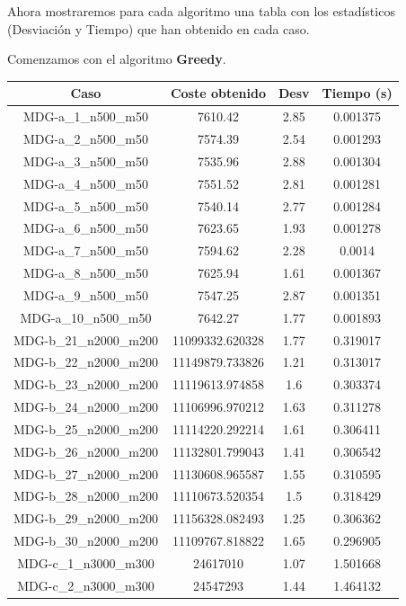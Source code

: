 \documentclass{article}
\begin{document}
Ahora mostraremos para cada algoritmo una tabla con los estadísticos (Desviación y Tiempo) que han obtenido en cada
caso.

\pagebreak

Comenzamos con el algoritmo \textbf{Greedy}.

\begin{table}[H]
	\centering
	\begin{tabular}{|cccc|}
		\hline
		Caso & Coste obtenido & Desv & Tiempo (s)\\ \hline
		MDG-a\_1\_n500\_m50 & 7610.42 & 2.85 & 0.001375\\
		MDG-a\_2\_n500\_m50 & 7574.39 & 2.54 & 0.001293\\
		MDG-a\_3\_n500\_m50 & 7535.96 & 2.88 & 0.001304\\
		MDG-a\_4\_n500\_m50 & 7551.52 & 2.81 & 0.001281\\
		MDG-a\_5\_n500\_m50 & 7540.14 & 2.77 & 0.001284\\
		MDG-a\_6\_n500\_m50 & 7623.65 & 1.93 & 0.001278\\
		MDG-a\_7\_n500\_m50 & 7594.62 & 2.28 & 0.0014\\
		MDG-a\_8\_n500\_m50 & 7625.94 & 1.61 & 0.001367\\
		MDG-a\_9\_n500\_m50 & 7547.25 & 2.87 & 0.001351\\
		MDG-a\_10\_n500\_m50 & 7642.27 & 1.77 & 0.001893\\
		MDG-b\_21\_n2000\_m200 & 11099332.620328 & 1.77 & 0.319017\\
		MDG-b\_22\_n2000\_m200 & 11149879.733826 & 1.21 & 0.313017\\
		MDG-b\_23\_n2000\_m200 & 11119613.974858 & 1.6 & 0.303374\\
		MDG-b\_24\_n2000\_m200 & 11106996.970212 & 1.63 & 0.311278\\
		MDG-b\_25\_n2000\_m200 & 11114220.292214 & 1.61 & 0.306411\\
		MDG-b\_26\_n2000\_m200 & 11132801.799043 & 1.41 & 0.306542\\
		MDG-b\_27\_n2000\_m200 & 11130608.965587 & 1.55 & 0.310595\\
		MDG-b\_28\_n2000\_m200 & 11110673.520354 & 1.5 & 0.318429\\
		MDG-b\_29\_n2000\_m200 & 11156328.082493 & 1.25 & 0.306362\\
		MDG-b\_30\_n2000\_m200 & 11109767.818822 & 1.65 & 0.296905\\
		MDG-c\_1\_n3000\_m300 & 24617010 & 1.07 & 1.501668\\
		MDG-c\_2\_n3000\_m300 & 24547293 & 1.44 & 1.464132\\

\end{tabular}
\end{table}
\end{document}
